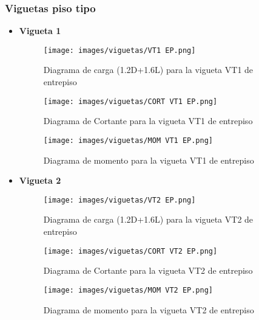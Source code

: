 \subsubsection{Viguetas piso tipo}
    \begin{itemize}
        \item \textbf{Vigueta 1}\\
            \begin{figure}[H]
                \centering
                \texttt{[image: images/viguetas/VT1 EP.png]}
                \caption{Diagrama de carga (1.2D+1.6L) para la vigueta VT1 de entrepiso}
                \label{fig:W VT1 EP}
            \end{figure}
            
            \begin{figure}[H]
                \centering
                \texttt{[image: images/viguetas/CORT VT1 EP.png]}
                \caption{Diagrama de Cortante para la vigueta VT1 de entrepiso}
                \label{fig:v VT1 EP}
            \end{figure}
            
             \begin{figure}[H]
                \centering
                \texttt{[image: images/viguetas/MOM VT1 EP.png]}
                \caption{Diagrama de momento para la vigueta VT1 de entrepiso}
                \label{fig:M VT1 EP}
            \end{figure}
            
            \item \textbf{Vigueta 2}\\
            \begin{figure}[H]
                \centering
                \texttt{[image: images/viguetas/VT2 EP.png]}
                \caption{Diagrama de carga (1.2D+1.6L) para la vigueta VT2 de entrepiso}
                \label{fig:W VT2 EP}
            \end{figure}
            
            \begin{figure}[H]
                \centering
                \texttt{[image: images/viguetas/CORT VT2 EP.png]} 
                \caption{Diagrama de Cortante para la vigueta VT2 de entrepiso}
                \label{fig:v VT2 EP}
            \end{figure}
            
             \begin{figure}[H]
                \centering
                \texttt{[image: images/viguetas/MOM VT2 EP.png]} 
                \caption{Diagrama de momento para la vigueta VT2 de entrepiso}
                \label{fig:M VT2 EP}
            \end{figure}
            

\end{itemize}

